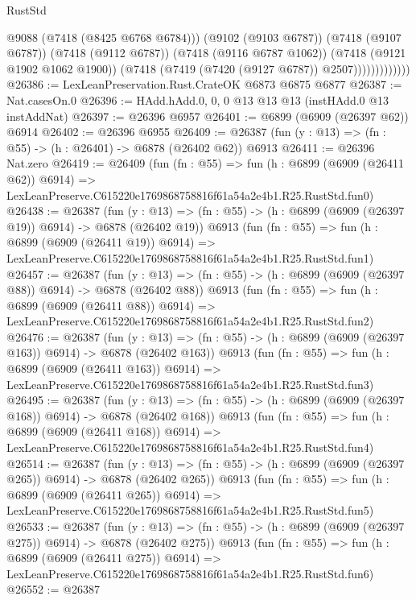 \begin{lexlean}{RustStd}
\begin{coremodule}
                            @9088
                            (@7418 (@8425 @6768 @6784)))
                          (@9102 (@9103 @6787))
                          (@7418 (@9107 @6787))
                          (@7418 (@9112 @6787))
                          (@7418 (@9116 @6787 @1062))
                          (@7418 (@9121 @1902 @1062 @1900))
                          (@7418 (@7419 (@7420 (@9127 @6787)) @2507)))))))))))))
@26386 := LexLeanPreservation.Rust.CrateOK @6873 @6875 @6877
@26387 := Nat.casesOn.{0}
@26396 := HAdd.hAdd.{0, 0, 0} @13 @13 @13 (instHAdd.{0} @13 instAddNat)
@26397 := @26396 @6957
@26401 := @6899 (@6909 (@26397 @62)) @6914
@26402 := @26396 @6955
@26409 := @26387 (fun (y : @13) => (fn : @55) -> (h : @26401) -> @6878 (@26402 @62)) @6913
@26411 := @26396 Nat.zero
@26419 := @26409
    (fun (fn : @55) =>
    fun (h : @6899 (@6909 (@26411 @62)) @6914) =>
    LexLeanPreserve.C615220e1769868758816f61a54a2e4b1.R25.RustStd.fun0)
@26438 := @26387
    (fun (y : @13) => (fn : @55) -> (h : @6899 (@6909 (@26397 @19)) @6914) -> @6878 (@26402 @19))
    @6913
    (fun (fn : @55) =>
    fun (h : @6899 (@6909 (@26411 @19)) @6914) =>
    LexLeanPreserve.C615220e1769868758816f61a54a2e4b1.R25.RustStd.fun1)
@26457 := @26387
    (fun (y : @13) => (fn : @55) -> (h : @6899 (@6909 (@26397 @88)) @6914) -> @6878 (@26402 @88))
    @6913
    (fun (fn : @55) =>
    fun (h : @6899 (@6909 (@26411 @88)) @6914) =>
    LexLeanPreserve.C615220e1769868758816f61a54a2e4b1.R25.RustStd.fun2)
@26476 := @26387
    (fun (y : @13) => (fn : @55) -> (h : @6899 (@6909 (@26397 @163)) @6914) -> @6878 (@26402 @163))
    @6913
    (fun (fn : @55) =>
    fun (h : @6899 (@6909 (@26411 @163)) @6914) =>
    LexLeanPreserve.C615220e1769868758816f61a54a2e4b1.R25.RustStd.fun3)
@26495 := @26387
    (fun (y : @13) => (fn : @55) -> (h : @6899 (@6909 (@26397 @168)) @6914) -> @6878 (@26402 @168))
    @6913
    (fun (fn : @55) =>
    fun (h : @6899 (@6909 (@26411 @168)) @6914) =>
    LexLeanPreserve.C615220e1769868758816f61a54a2e4b1.R25.RustStd.fun4)
@26514 := @26387
    (fun (y : @13) => (fn : @55) -> (h : @6899 (@6909 (@26397 @265)) @6914) -> @6878 (@26402 @265))
    @6913
    (fun (fn : @55) =>
    fun (h : @6899 (@6909 (@26411 @265)) @6914) =>
    LexLeanPreserve.C615220e1769868758816f61a54a2e4b1.R25.RustStd.fun5)
@26533 := @26387
    (fun (y : @13) => (fn : @55) -> (h : @6899 (@6909 (@26397 @275)) @6914) -> @6878 (@26402 @275))
    @6913
    (fun (fn : @55) =>
    fun (h : @6899 (@6909 (@26411 @275)) @6914) =>
    LexLeanPreserve.C615220e1769868758816f61a54a2e4b1.R25.RustStd.fun6)
@26552 := @26387

\end{coremodule}
\end{lexlean}
